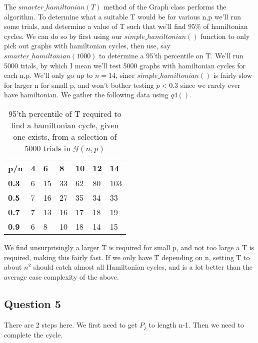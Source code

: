 \documentclass[10pt,a4paper]{report}
\begin{document}
The $smarter\_hamiltonian(T)$ method of the Graph class performs the algorithm. To determine what a suitable T would be for various n,p we'll run some trials, and determine a value of T such that we'll find $95\%$ of hamiltonian cycles. We can do so by first using our $simple\_hamiltonian()$ function to only pick out graphs with hamiltonian cycles, then use, say $smarter\_hamiltonian(1000)$ to determine a 95'th percentile on T. We'll run 5000 trials, by which I mean we'll test 5000 graphs with hamiltonian cycles for each n,p. We'll only go up to $n=14$, since $simple\_hamiltonian()$ is fairly slow for larger n for small p, and won't bother testing $p<0.3$ since we rarely ever have hamiltonian. We gather the following data using $q4()$.

\begin{table}[h]
\centering
\begin{tabular}{|l|l|l|l|l|l|l|}
\hline
\textbf{p/n} & \textbf{4} & \textbf{6} & \textbf{8} & \textbf{10} & \textbf{12} & \textbf{14} \\ \hline
\textbf{0.3} & 6          & 15         & 33         & 62          & 80          & 103         \\ \hline
\textbf{0.5} & 7          & 16         & 27         & 35          & 34          & 33          \\ \hline
\textbf{0.7} & 7          & 13         & 16         & 17          & 18          & 19          \\ \hline
\textbf{0.9} & 6          & 8          & 10         & 18          & 14          & 15          \\ \hline
\end{tabular}
\caption{95'th percentile of T required to find a hamiltonian cycle, given one exists, from a selection of 5000 trials in $\mathcal{G}(n,p)$ }
\label{tab:my-table}
\end{table}

We find unsurprisingly a larger T is required for small p, and not too large a T is required, making this fairly fast. If we only have T depending on n, setting T to about $n^2$ should catch almost all Hamiltonian cycles, and is a lot better than the average case complexity of the above.

\subsection*{Question 5}
There are 2 steps here. We first need to get $P_j$ to length n-1. Then we need to complete the cycle. \\
\end{document}
